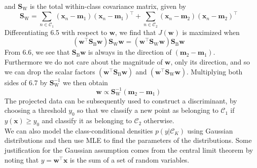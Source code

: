 \documentclass[twoside]{article}
\begin{document}
and $\textbf{S}_\text{W}$ is the total within-class covariance matrix, given by
\begin{equation*}
    \textbf{S}_\text{W} = \sum\limits_{n \in \mathcal{C}_1}(\boldsymbol{x}_n - \boldsymbol{m}_1)(\boldsymbol{x}_n - \boldsymbol{m}_1)^\intercal + \sum\limits_{n \in \mathcal{C}_2}(\boldsymbol{x}_n - \boldsymbol{m}_2)(\boldsymbol{x}_n - \boldsymbol{m}_2)^\intercal 
\end{equation*}
Differentiating 6.5 with respect to $\boldsymbol{w}$, we find that $J(\boldsymbol{w})$ is maximized when
\begin{equation}
    (\boldsymbol{w}^\intercal\textbf{S}_\text{B}\boldsymbol{w})\textbf{S}_\text{W}\boldsymbol{w} = (\boldsymbol{w}^\intercal\textbf{S}_\text{W}\boldsymbol{w})\textbf{S}_\text{B}\boldsymbol{w}
\end{equation}
From 6.6, we see that $\textbf{S}_\text{B}\boldsymbol{w}$ is always in the direction of $(\boldsymbol{m}_2 - \boldsymbol{m}_1)$. Furthermore we do not care about the magnitude of $\boldsymbol{w}$, only its direction, and so we can drop the scalar factors $(\boldsymbol{w}^\intercal\textbf{S}_\text{B}\boldsymbol{w})$ and $(\boldsymbol{w}^\intercal\textbf{S}_\text{W}\boldsymbol{w})$. Multiplying both sides of 6.7 by $\textbf{S}_\text{W}^{-1}$ we then obtain
\begin{equation*}
    \boldsymbol{w} \propto \textbf{S}_\text{W}^{-1}(\boldsymbol{m}_2 - \boldsymbol{m}_1)
\end{equation*}
The projected data can be subsequently used to construct a discriminant, by choosing a threshold $y_0$ so that we classify a new point as belonging to $\mathcal{C}_1$ if $y(\boldsymbol{x}) \geq y_0$ and classify it as belonging to $\mathcal{C}_2$ otherwise.\\
We can also model the class-conditional densities $p(y|\mathcal{C}_K)$ using Gaussian distributions and then use MLE to find the parameters of the distributions. Some justification for the Gaussian assumption comes from the central limit theorem by noting that $y = \boldsymbol{w^\intercal x}$ is the sum of a set of random variables.
\newpage
\end{document}
